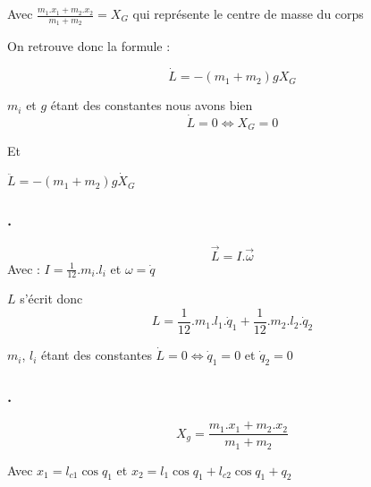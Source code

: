 \documentclass[a4paper,12pt]{report}
\begin{document}
Avec $\frac{m_1.x_1 + m_2.x_2}{m_1 + m_2} = X_G$ qui représente le centre de masse du corps

On retrouve donc la formule :

$$\dot{L} = - (m_1 + m_2)g X_G$$

$m_i$ et $g$ étant des constantes nous avons bien
$$\dot{L} = 0 \Leftrightarrow X_G = 0$$

Et

$\ddot{L} = - (m_1 + m_2)g \dot{X}_G$



\subsubsection{.}
\label{subs:}

$$\overrightarrow{L} = I.\overrightarrow{\omega}$$
Avec : $I = \frac{1}{12}.m_i.l_i$ et $\omega = \dot{q}$

$L$ s'écrit donc
$$L = \frac{1}{12}.m_1.l_1.\dot{q}_1 + \frac{1}{12}.m_2.l_2.\dot{q}_2$$

$m_i$, $l_i$ étant des constantes $\dot{L} = 0 \Leftrightarrow \dot{q}_1 = 0$ et $\dot{q}_2 = 0$


\subsubsection{.}
\label{subs:}

$$X_g = \frac{m_1.x_1 + m_2.x_2}{m_1 + m_2}$$

Avec $x_1 = l_{c1} \cos{q_1}$ et $x_2 = l_{1} \cos{q_1} + l_{c2} \cos{q_1 + q_2}$
\end{document}
